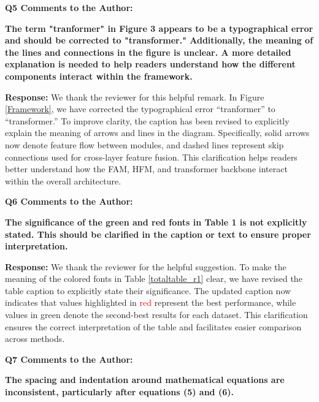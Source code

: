 \documentclass[lettersize,journal,onecolumn,12pt]{IEEEtran}
\begin{document}
{\color{BlueGreen} \textbf{Q5 Comments to the Author:}

\textbf{The term "tranformer" in Figure 3 appears to be a typographical error and should be corrected to "transformer." Additionally, the meaning of the lines and connections in the figure is unclear. A more detailed explanation is needed to help readers understand how the different components interact within the framework.}} 

\textbf{Response:}
We thank the reviewer for this helpful remark. 
In Figure \ref{Framework}, we have corrected the typographical error “tranformer” to “transformer.” 
To improve clarity, the caption has been revised to explicitly explain the meaning of arrows and lines in the diagram. 
Specifically, solid arrows now denote feature flow between modules, and dashed lines represent skip connections used for cross-layer feature fusion. 
This clarification helps readers better understand how the FAM, HFM, and transformer backbone interact within the overall architecture. \\[10pt]









{\color{BlueGreen} \textbf{Q6 Comments to the Author:}

\textbf{The significance of the green and red fonts in Table 1 is not explicitly stated. This should be clarified in the caption or text to ensure proper interpretation.}} 

\textbf{Response:}
We thank the reviewer for the helpful suggestion. 
To make the meaning of the colored fonts in Table \ref{totaltable_r1} clear, we have revised the table caption to explicitly state their significance. 
The updated caption now indicates that values highlighted in \textcolor{red}{red} represent the best performance, while values in \textcolor{green!50!black}{green} denote the second-best results for each dataset. 
This clarification ensures the correct interpretation of the table and facilitates easier comparison across methods. 

\clearpage






{\color{BlueGreen} \textbf{Q7 Comments to the Author:}

\textbf{The spacing and indentation around mathematical equations are inconsistent, particularly after equations (5) and (6).}} 
\end{document}
